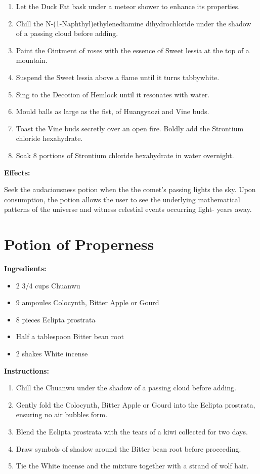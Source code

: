 \documentclass{article}
\begin{document}
\begin{enumerate}
  \item Let the Duck Fat bask under a meteor shower to enhance its properties.
  \item Chill the N-(1-Naphthyl)ethylenediamine dihydrochloride under the shadow of a passing cloud before adding.
  \item Paint the Ointment of roses with the essence of Sweet lessia at the top of a mountain.
  \item Suspend the Sweet lessia above a flame until it turns tabbywhite.
  \item Sing to the Decotion of Hemlock until it resonates with water.
  \item Mould balls as large as the fist, of Huangyaozi and Vine buds.
  \item Toast the Vine buds secretly over an open fire. Boldly add the Strontium chloride hexahydrate.
  \item Soak 8 portions of Strontium chloride hexahydrate in water overnight.
\end{enumerate}

\textbf{Effects:}

Seek the audaciousness potion when the the comet’s passing lights the sky. Upon consumption, the potion allows the user to see the underlying mathematical patterns of the universe and witness celestial events occurring light- years away.

\newpage
\section*{Potion of Properness}

\textbf{Ingredients:}

\begin{itemize}
  \item 2 3/4 cups Chuanwu
  \item 9 ampoules Colocynth, Bitter Apple or Gourd
  \item 8 pieces Eclipta prostrata
  \item Half a tablespoon Bitter bean root
  \item 2 shakes White incense
\end{itemize}

\textbf{Instructions:}

\begin{enumerate}
  \item Chill the Chuanwu under the shadow of a passing cloud before adding.
  \item Gently fold the Colocynth, Bitter Apple or Gourd into the Eclipta prostrata, ensuring no air bubbles form.
  \item Blend the Eclipta prostrata with the tears of a kiwi collected for two days.
  \item Draw symbols of shadow around the Bitter bean root before proceeding.
  \item Tie the White incense and the mixture together with a strand of wolf hair.
\end{enumerate}
\end{document}
